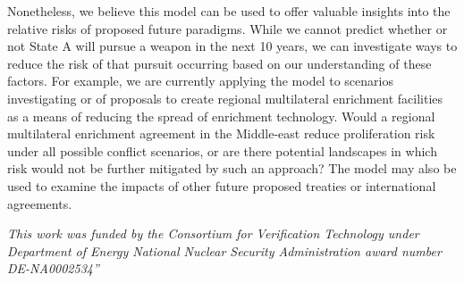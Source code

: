 Nonetheless, we believe this model can be used to offer valuable insights into the relative risks of proposed future paradigms. While we cannot predict whether or not State A will pursue a weapon in the next 10 years, we can investigate ways to reduce the risk of that pursuit occurring based on our understanding of these factors. For example, we are currently applying the model to scenarios investigating or of proposals to create regional multilateral enrichment facilities as a means of reducing the spread of enrichment technology.  Would a regional multilateral enrichment agreement in the Middle-east reduce proliferation risk under all possible conflict scenarios, or are there potential landscapes in which risk would not be further mitigated by such an approach?  The model may also be used to examine the impacts of other future proposed treaties or international agreements.

\textit{This work was funded by the Consortium for Verification Technology under Department of Energy National Nuclear Security Administration award number DE-NA0002534”}

